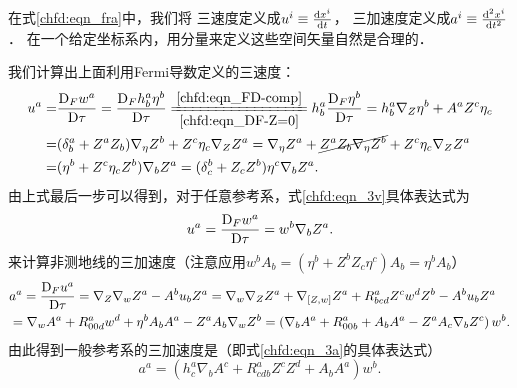 在式\eqref{chfd:eqn_fra}中，我们将
三速度定义成$u^i\equiv \frac{{\rm d} x^i}{{\rm d} t}$，
三加速度定义成$a^i\equiv \frac{{\rm d}^2 x^i}{{\rm d} t^2}$．
在一个给定坐标系内，用分量来定义这些空间矢量自然是合理的．

我们计算出上面利用Fermi导数定义的三速度：
\begin{align*}
    u^a=&\frac{{\rm D}_F w^a}{{\rm D} \tau}
    =\frac{{\rm D}_F h^a_b \eta^b}{{\rm D} \tau}
    \xlongequal[\ref{chfd:eqn_DF-Z=0}]{\ref{chfd:eqn_FD-comp}}
    h^a_b \frac{{\rm D}_F  \eta^b}{{\rm D} \tau}
    =h^a_b\nabla_Z \eta^b + A^a Z^c \eta_c  \\
    =& (\delta^a_b +Z^a Z_b) \nabla_\eta Z^b
    + Z^c \eta_c \nabla_Z Z^a
    = \nabla_\eta Z^a  + \cancel{Z^a Z_b \nabla_\eta Z^b }
    + Z^c \eta_c \nabla_Z Z^a \\
    =&(\eta^b + Z^c \eta_c Z^b) \nabla_b Z^a
    =(\delta^b_c + Z_c  Z^b) \eta^c \nabla_b Z^a .
\end{align*}
由上式最后一步可以得到，对于任意参考系，式\eqref{chfd:eqn_3v}具体表达式为
\begin{equation}\label{chfd:eqn_v3-Fermi}
    u^a = \frac{{\rm D}_F w^a}{{\rm D} \tau} = w^b \nabla_b Z^a.
\end{equation}
来计算非测地线的三加速度（注意应用$w^b A_b= (\eta^b + Z^b Z_c\eta^c)A_b = \eta^b A_b$）
\setlength{\mathindent}{0em}
\begin{align*}
    &a^a= \frac{{\rm D}_F u^a}{{\rm D} \tau}=\nabla_Z \nabla_w Z^a - A^b u_b Z^a
    =\nabla_w \nabla_Z Z^a + \nabla_{[Z,w]} Z^a + R^a_{bcd}Z^c w^d Z^b  - A^b u_b Z^a \\
    &=\nabla_w A^a + R^a_{00d} w^d + \eta^bA_b A^a -  Z^a A_b  \nabla_w Z^b
    =\left( \nabla_b A^a + R^a_{00b} + A_b A^a - Z^a A_c\nabla_b Z^c \right)w^b.
\end{align*}\setlength{\mathindent}{2em}
由此得到一般参考系的三加速度是（即式\eqref{chfd:eqn_3a}的具体表达式）
\begin{equation}\label{chfd:eqn_a3-Fermi}
    a^a = \left( h^a_c \nabla_b A^c + R^a_{cdb}Z^cZ^d + A_b A^a  \right)w^b .
\end{equation}





